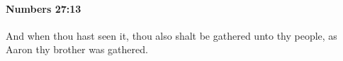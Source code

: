
		\paragraph{Numbers 27:13} %
			\label{NUMBERS-27-13}

			And when thou hast seen it, thou also shalt be gathered unto thy people, as Aaron thy brother was gathered.


